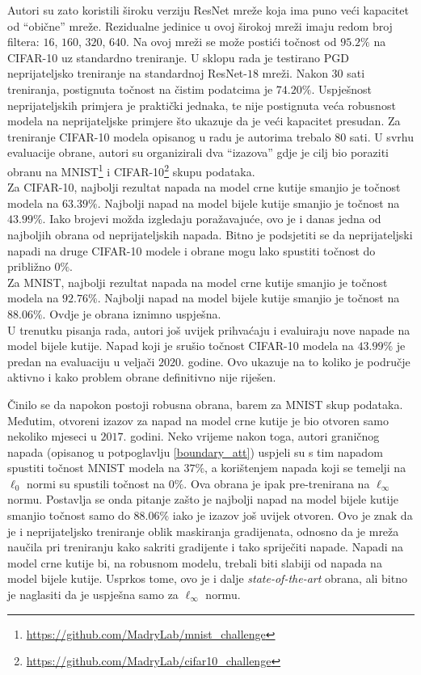 \documentclass[utf8, diplomski]{fer}
\begin{document}
Autori su zato koristili široku verziju ResNet mreže koja ima puno veći kapacitet od ``obične'' mreže. Rezidualne jedinice u ovoj širokoj mreži imaju redom broj filtera: $16$, $160$, $320$, $640$. Na ovoj mreži se može postići točnost od $95.2\%$ na CIFAR-10 uz standardno treniranje. U sklopu rada je testirano PGD neprijateljsko treniranje na standardnoj ResNet-$18$ mreži. Nakon $30$ sati treniranja, postignuta točnost na čistim podatcima je $74.20\%$. Uspješnost neprijateljskih primjera je praktički jednaka, te nije postignuta veća robusnost modela na neprijateljske primjere što ukazuje da je veći kapacitet presudan. Za treniranje CIFAR-10 modela opisanog u radu je autorima trebalo $80$ sati. U svrhu evaluacije obrane, autori su organizirali dva ``izazova'' gdje je cilj bio poraziti obranu na MNIST\footnote{\url{https://github.com/MadryLab/mnist_challenge}} i CIFAR-10\footnote{\url{https://github.com/MadryLab/cifar10_challenge}} skupu podataka. 
\\
Za CIFAR-10, najbolji rezultat napada na model crne kutije smanjio je točnost modela na $63.39\%$. Najbolji napad na model bijele kutije smanjio je točnost na $43.99\%$. Iako brojevi možda izgledaju poražavajuće, ovo je i danas jedna od najboljih obrana od neprijateljskih napada. Bitno je podsjetiti se da neprijateljski napadi na druge CIFAR-10 modele i obrane mogu lako spustiti točnost do približno $0\%$.
\\
Za MNIST, najbolji rezultat napada na model crne kutije smanjio je točnost modela na $92.76\%$. Najbolji napad na model bijele kutije smanjio je točnost na $88.06\%$. Ovdje je obrana iznimno uspješna. \\
U trenutku pisanja rada, autori još uvijek prihvaćaju i evaluiraju nove napade na model bijele kutije. Napad koji je srušio točnost CIFAR-10 modela na $43.99\%$ je predan na evaluaciju u veljači $2020.$ godine. Ovo ukazuje na to koliko je područje aktivno i kako problem obrane definitivno nije riješen.
\par
Činilo se da napokon postoji robusna obrana, barem za MNIST skup podataka. Međutim, otvoreni izazov za napad na model crne kutije je bio otvoren samo nekoliko mjeseci u $2017.$ godini. Neko vrijeme nakon toga, autori graničnog napada (opisanog u potpoglavlju \ref{boundary_att}) uspjeli su s tim napadom spustiti točnost MNIST modela na $37\%$, a korištenjem napada koji se temelji na $\ell_{0}$ normi su spustili točnost na $0\%$\citep{towards_mnist}. Ova obrana je ipak pre-trenirana na $\ell_{\infty}$ normu. Postavlja se onda pitanje zašto je najbolji napad na model bijele kutije smanjio točnost samo do $88.06\%$ iako je izazov još uvijek otvoren. Ovo je znak da je i neprijateljsko treniranje oblik maskiranja gradijenata, odnosno da je mreža naučila pri treniranju kako sakriti gradijente i tako spriječiti napade. Napadi na model crne kutije bi, na robusnom modelu, trebali biti slabiji od napada na model bijele kutije. Usprkos tome, ovo je i dalje \textit{state-of-the-art} obrana, ali bitno je naglasiti da je uspješna samo za $\ell_{\infty}$ normu.
\end{document}
